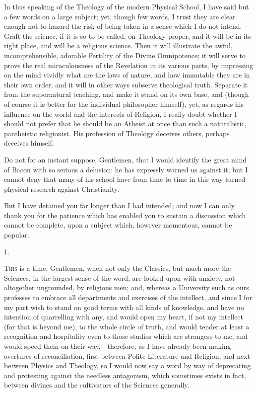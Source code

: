 In thus speaking of the Theology of the modern Physical School, I have said but a few words on a large subject; yet, though
few words, I trust they are clear enough not to hazard the risk of
being taken in a sense which I do not intend. Graft the science, if it
is so to be called, on Theology proper, and it will be in its right
place, and will be a religious science. Then it will illustrate the
awful, incomprehensible, adorable Fertility of the Divine Omnipotence;
it will serve to prove the real miraculousness of the Revelation in
its various parts, by impressing on the mind vividly what are the laws
of nature, and how immutable they are in their own order; and it will
in other ways subserve theological truth. Separate it from the
supernatural teaching, and make it stand on its own base, and (though
of course it is better for the individual philosopher himself), yet,
as regards his influence on the world and the interests of Religion, I
really doubt whether I should not prefer that he should be an Atheist
at once than such a naturalistic, pantheistic religionist. His
profession of Theology deceives others, perhaps deceives himself.

Do not for an instant suppose, Gentlemen, that I would identify the
great mind of Bacon with so serious a delusion: he has expressly
warned us against it; but I cannot deny that many of his school have
from time to time in this way turned physical research against
Christianity.

But I have detained you far longer than I had intended; and now I
can only thank you for the patience which has enabled you to sustain a
discussion which cannot be complete, upon a subject which, however
momentous, cannot be popular.



1.

T\textsc{his} is a time, Gentlemen, when not only the Classics, but
much more the Sciences, in the largest sense of the word, are looked
upon with anxiety, not altogether ungrounded, by religious men; and,
whereas a University such as ours professes to embrace all departments
and exercises of the intellect, and since I for my part wish to stand
on good terms with all kinds of knowledge, and have no intention of
quarrelling with any, and would open my heart, if not my intellect
(for that is beyond me), to the whole circle of truth, and would
tender at least a recognition and hospitality even to those studies
which are strangers to me, and would speed them on their way,—therefore,
as I have already been making overtures of reconciliation, first
between Polite Literature and Religion, and next between Physics and
Theology, so I would now say a word by way of deprecating and
protesting against the needless antagonism, which sometimes exists in
fact, between divines and the cultivators of the Sciences generally.

